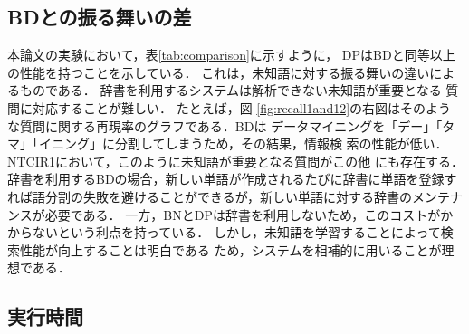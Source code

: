 \subsection{BDとの振る舞いの差}

本論文の実験において，表\ref{tab:comparison}に示すように，
DPはBDと同等以上の性能を持つことを示している．
これは，未知語に対する振る舞いの違いによるものである．
辞書を利用するシステムは解析できない未知語が重要となる
質問に対応することが難しい．
たとえば，図
\ref{fig:recall1and12}の右図はそのような質問に関する再現率のグラフである．BDは
データマイニングを「デー」「タマ」「イニング」に分割してしまうため，その結果，情報検
索の性能が低い．NTCIR1において，このように未知語が重要となる質問がこの他
にも存在する．
辞書を利用するBDの場合，新しい単語が作成されるたびに辞書に単語を登録すれば語分割の失敗を避けることができるが，新しい単語に対する辞書のメンテナンスが必要である．
一方，BNとDPは辞書を利用しないため，このコストがかからないという利点を持っている．
しかし，未知語を学習することによって検索性能が向上することは明白である
ため，システムを相補的に用いることが理想である．

\subsection{実行時間}

